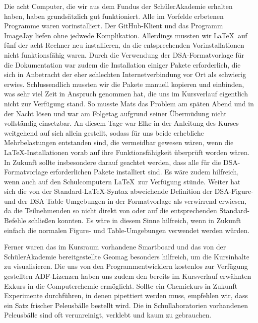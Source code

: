 \documentclass{scrartcl}
\begin{document}
Die acht Computer, die wir aus dem Fundus der Sch{\"u}lerAkademie erhalten haben, haben grunds{\"a}tzlich gut funktioniert. Alle im Vorfelde erbetenen Programme waren vorinstalliert. Der GitHub-Klient und das Programm ImageJay liefen ohne jedwede Komplikation. Allerdings mussten wir \LaTeX\ auf f{\"u}nf der acht Rechner neu installieren, da die entsprechenden Vorinstallationen nicht funktionsf{\"a}hig waren. Durch die Verwendung der DSA-Formatvorlage f{\"u}r die Dokumentation war zudem die Installation einiger Pakete erforderlich, die sich in Anbetracht der eher schlechten Internetverbindung vor Ort als schwierig erwies. Schlussendlich mussten wir die Pakete manuell kopieren und einbinden, was sehr viel Zeit in Anspruch genommen hat, die uns im Kursverlauf eigentlich nicht zur Verf{\"u}gung stand. So musste Mats das Problem am sp{\"a}ten Abend und in der Nacht l{\"o}sen und war am Folgetag aufgrund seiner {\"U}berm{\"u}dung nicht vollst{\"a}ndig einsetzbar. An diesem Tage war Elke in der Anleitung des Kurses weitgehend auf sich allein gestellt, sodass f{\"u}r uns beide erhebliche Mehrbelastungen entstanden sind, die vermeidbar gewesen w{\"a}ren, wenn die \LaTeX -Installationen vorab auf ihre Funktionsf{\"a}higkeit {\"u}berpr{\"u}ft worden w{\"a}ren. In Zukunft sollte insbesondere darauf geachtet werden, dass alle f{\"u}r die DSA-Formatvorlage erforderlichen Pakete installiert sind. Es w{\"a}re zudem hilfreich, wenn auch auf den Schulcomputern \LaTeX\ zur Verf{\"u}gung st{\"u}nde. Weiter hat sich die von der Standard-\LaTeX -Syntax abweichende Definition der DSA-Figure- und der DSA-Table-Umgebungen in der Formatvorlage als verwirrend erwiesen, da die Teilnehmenden so nicht direkt von oder auf die entsprechenden Standard-Befehle schlie{\ss}en konnten. Es w{\"a}re in diesem Sinne hilfreich, wenn in Zukunft einfach die normalen Figure- und Table-Umgebungen verwendet werden w{\"u}rden.\medskip

Ferner waren das im Kursraum vorhandene Smartboard und das von der Sch{\"u}lerAkademie bereitgestellte Geomag besonders hilfreich, um die Kursinhalte zu visualisieren. Die uns von den Programmentwicklern kostenlos zur Verf{\"u}gung gestellten ADF-Lizenzen haben uns zudem den bereits im Kursverlauf erw{\"a}hnten Exkurs in die Computerchemie erm{\"o}glicht. Sollte ein Chemiekurs in Zukunft Experimente durchf{\"u}hren, in denen pipettiert werden muss, empfehlen wir, dass ein Satz frischer Peleusb{\"a}lle bestellt wird. Die in Schullaboratorien vorhandenen Peleusb{\"a}lle sind oft verunreinigt, verklebt und kaum zu gebrauchen.\medskip
\end{document}
